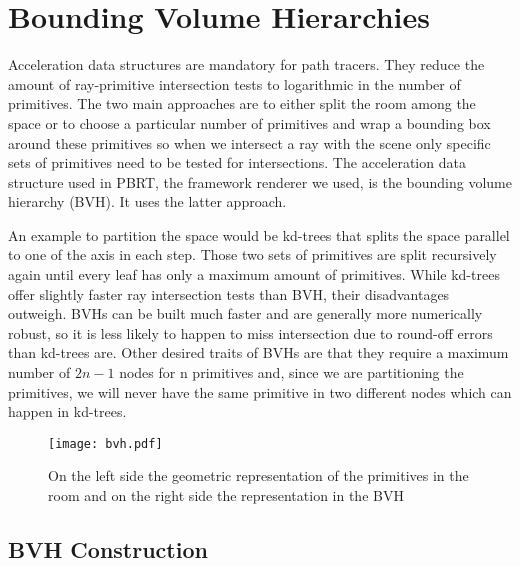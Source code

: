 \section{Bounding Volume Hierarchies}
\label{sec:preliminaries:bvh}

Acceleration data structures are mandatory for path tracers. They reduce the amount of ray-primitive intersection tests to logarithmic in the number of primitives. The two main approaches are to either split the room among the space or to choose a particular number of primitives and wrap a bounding box around these primitives so when we intersect a ray with the scene only specific sets of primitives need to be tested for intersections. The acceleration data structure used in PBRT, the framework renderer we used, is the bounding volume hierarchy (BVH). It uses the latter approach. \cite{PBRT}

An example to partition the space would be kd-trees that splits the space parallel to one of the axis in each step. Those two sets of primitives are split recursively again until every leaf has only a maximum amount of primitives.  While kd-trees offer slightly faster ray intersection tests than BVH, their disadvantages outweigh. BVHs can be built much faster and are generally more numerically robust, so it is less likely to happen to miss intersection due to round-off errors than kd-trees are. Other desired traits of BVHs are that they require a maximum number of $2n - 1$ nodes for n primitives and, since we are partitioning the primitives, we will never have the same primitive in two different nodes which can happen in kd-trees. \cite{PBRT}

\begin{figure}
	\begin{center}
		\texttt{[image: bvh.pdf]}
		\caption{On the left side the geometric representation of the primitives in the room and on the right side the representation in the BVH}
		\label{fig:bvh}
	\end{center}
\end{figure}


\subsection{BVH Construction}
\label{subs:const}

